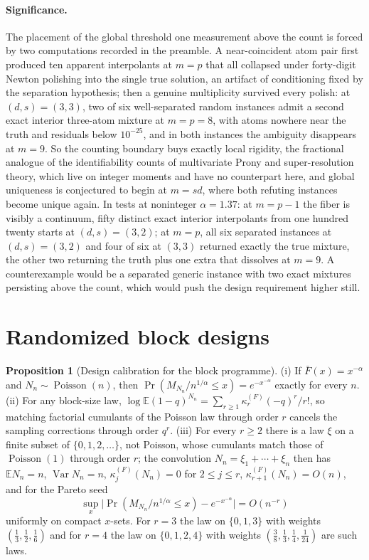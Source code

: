 \documentclass[11pt]{article}
\theoremstyle{definition}
\newcommand{\E}{\mathbb E}
\providecommand{\E}{\mathbb E}
\newtheorem{proposition}{Proposition}
\begin{document}
\paragraph{Significance.}
The placement of the global threshold one measurement above the count is forced by two computations recorded in the preamble.  A near-coincident atom pair first produced ten apparent interpolants at $m=p$ that all collapsed under forty-digit Newton polishing into the single true solution, an artifact of conditioning fixed by the separation hypothesis; then a genuine multiplicity survived every polish: at $(d,s)=(3,3)$, two of six well-separated random instances admit a second exact interior three-atom mixture at $m=p=8$, with atoms nowhere near the truth and residuals below $10^{-25}$, and in both instances the ambiguity disappears at $m=9$.  So the counting boundary buys exactly local rigidity, the fractional analogue of the identifiability counts of multivariate Prony and super-resolution theory, which live on integer moments and have no counterpart here, and global uniqueness is conjectured to begin at $m=sd$, where both refuting instances become unique again.  In tests at noninteger $\alpha=1.37$: at $m=p-1$ the fiber is visibly a continuum, fifty distinct exact interior interpolants from one hundred twenty starts at $(d,s)=(3,2)$; at $m=p$, all six separated instances at $(d,s)=(3,2)$ and four of six at $(3,3)$ returned exactly the true mixture, the other two returning the truth plus one extra that dissolves at $m=9$.  A counterexample would be a separated generic instance with two exact mixtures persisting above the count, which would push the design requirement higher still.

\section{Randomized block designs}

\begin{proposition}[Design calibration for the block programme]\label{ah:block}
(i) If $\bar F(x)=x^{-\alpha}$ and $N_n\sim\operatorname{Poisson}(n)$, then $\Pr(M_{N_n}/n^{1/\alpha}\le x)=e^{-x^{-\alpha}}$ exactly for every $n$.  (ii) For any block-size law, $\log\E(1-q)^{N_n}=\sum_{r\ge1}\kappa_r^{(F)}(-q)^r/r!$, so matching factorial cumulants of the Poisson law through order $r$ cancels the sampling corrections through order $q^r$.  (iii) For every $r\ge2$ there is a law $\xi$ on a finite subset of $\{0,1,2,\ldots\}$, not Poisson, whose cumulants match those of $\operatorname{Poisson}(1)$ through order $r$; the convolution $N_n=\xi_1+\cdots+\xi_n$ then has $\E N_n=n$, $\operatorname{Var}N_n=n$, $\kappa_j^{(F)}(N_n)=0$ for $2\le j\le r$, $\kappa_{r+1}^{(F)}(N_n)=O(n)$, and for the Pareto seed
\[
\sup_x\bigl|\Pr(M_{N_n}/n^{1/\alpha}\le x)-e^{-x^{-\alpha}}\bigr|=O(n^{-r})
\]
uniformly on compact $x$-sets.  For $r=3$ the law on $\{0,1,3\}$ with weights $(\tfrac13,\tfrac12,\tfrac16)$ and for $r=4$ the law on $\{0,1,2,4\}$ with weights $(\tfrac38,\tfrac13,\tfrac14,\tfrac1{24})$ are such laws.
\end{proposition}
\end{document}
